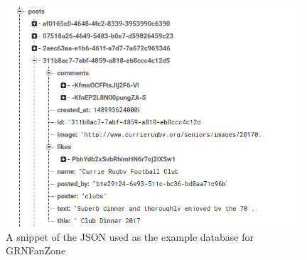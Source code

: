 \begin{figure}
\begin{center}
\includegraphics[width=11cm]{figures/dbexample}
\end{center}
\caption{A snippet of the JSON used as the example database for GRNFanZone}
\label{fig:dbexample}
\end{figure}